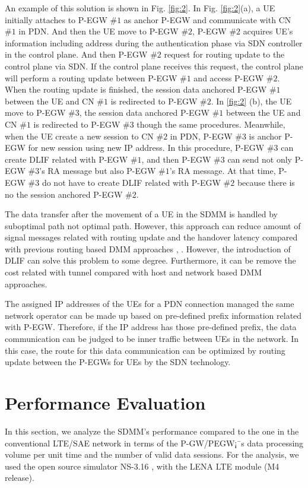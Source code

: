 \documentclass[runningheads,a4paper]{llncs}
\begin{document}
An example of this solution is shown in Fig. \ref{fig:2}. In Fig. \ref{fig:2}(a), a UE initially attaches to P-EGW $\#1$ as anchor P-EGW and communicate with CN $\#1$ in PDN. And then the UE move to P-EGW $\#2$, P-EGW $\#2$ acquires UE's information including address during the authentication phase via SDN controller in the control plane. And then P-EGW $\#2$ request for routing update to the control plane via SDN. If the control plane receives this request, the control plane will perform a routing update between P-EGW $\#1$ and access P-EGW $\#2$. When the routing update is finished, the session data anchored P-EGW $\#1$ between the UE and CN $\#1$ is redirected to P-EGW $\#2$. In \ref{fig:2} (b), the UE move to P-EGW $\#3$, the session data anchored P-EGW $\#1$ between the UE and CN $\#1$ is redirected to P-EGW $\#3$ though the same procedures. Meanwhile, when the UE create a new session to CN $\#2$ in PDN, P-EGW $\#3$ is anchor P-EGW for new session using new IP address. In this procedure, P-EGW $\#3$ can create DLIF related with P-EGW $\#1$, and then P-EGW $\#3$ can send not only P-EGW $\#3$'s RA message but also P-EGW $\#1$'s RA message. At that time, P-EGW $\#3$ do not have to create DLIF related with P-EGW $\#2$ because there is no the session anchored P-EGW $\#2$.

The data transfer after the movement of a UE in the SDMM is handled by suboptimal path not optimal path. However, this approach can reduce amount of signal messages related with routing update and the handover latency compared with previous routing based DMM approaches \cite{ref11}, \cite{ref12}. However, the introduction of DLIF can solve this problem to some degree. Furthermore, it can be remove the cost related with tunnel compared with host and network based DMM approaches.

The assigned IP addresses of the UEs for a PDN connection managed the same network operator can be made up based on pre-defined prefix information related with P-EGW. Therefore, if the IP address has those pre-defined prefix, the data communication can be judged to be inner traffic between UEs in the network. In this case, the route for this data communication can be optimized by routing update between the P-EGWs for UEs by the SDN technology.


\section{Performance Evaluation}

In this section, we analyze the SDMM's performance compared to the one in the conventional LTE/SAE network in terms of the P-GW/PEGW¡¯s data processing volume per unit time and the number of valid data sessions. For the analysis, we used the open source simulator NS-3.16 \cite{ref13}, with the LENA LTE module (M4 release).
\end{document}

